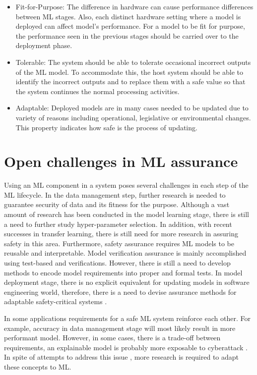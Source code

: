 \begin{itemize}
    \item Fit-for-Purpose: The difference in hardware can cause performance differences between ML stages. Also, each distinct hardware setting where a model is deployed can affect model's performance. For a model to be fit for purpose, the performance seen in the previous stages should be carried over to the deployment phase. 
    \item Tolerable: The system should be able to tolerate occasional incorrect outputs of the ML model. To accommodate this, the host system should be able to identify the incorrect outputs and to replace them with a safe value so that the system continues the normal processing activities.
    \item Adaptable: Deployed models are in many cases needed to be updated due to variety of reasons including operational, legislative or environmental changes. This property indicates how safe is the process of updating. 
\end{itemize}

\section{Open challenges in ML assurance}
Using an ML component in a system poses several challenges in each step of the ML lifecycle. In the data management step, further research is needed to guarantee security of data and its fitness for the purpose. Although a vast amount of research has been conducted in the model learning stage, there is still a need to further study hyper-parameter selection. In addition, with recent successes in transfer learning, there is still need for more research in assuring safety in this area. Furthermore, safety assurance requires ML models to be reusable and interpretable. Model verification assurance is mainly accomplished using test-based and verifications. However, there is still a need to develop methods to encode model requirements into proper and formal tests. In model deployment stage, there is no explicit equivalent for updating models in software engineering world, therefore, there is a need to devise assurance methods for adaptable safety-critical systems \cite{Ashmore2021}.

In some applications requirements for a safe ML system reinforce each other. For example, accuracy in data management stage will most likely result in more performant model. However, in some cases, there is a trade-off between requirements, an explainable model is probably more exposable to cyberattack \cite{Ashmore2021}. In spite of attempts to address this issue \cite{Johnson2019}, more research is required to adapt these concepts to ML.  